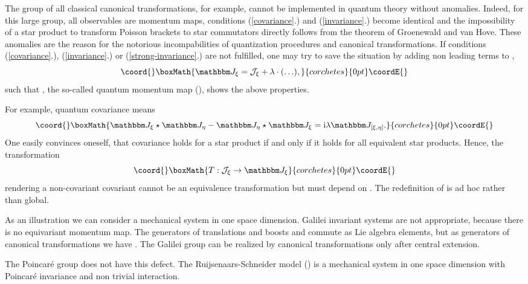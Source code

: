 \documentclass[a4paper,12pt]{article}
\begin{document}
The group of all classical canonical transformations, for example, cannot be
implemented in quantum theory without anomalies. Indeed, for this large group,
all observables are momentum maps, conditions (\ref{covariance}.) and
(\ref{invariance}.) become identical and  
the impossibility of a star product to transform Poisson brackets to star
commutators directly follows from the theorem of Groenewald and van Hove. These
anomalies are the reason for the notorious incompabilities of quantization
procedures and canonical transformations. If conditions (\ref{covariance}.),
(\ref{invariance}.) or (\ref{strong-invariance}.) are not fulfilled, one may try
to save the situation by adding non leading terms to \coordHE{},
\[\coord{}\boxMath{
\mathbbm J_\xi=\mathcal J_\xi+\lambda\cdot(\ldots),
}{corchetes}{0pt}\coordE{}\]
such that \coordHE{}, the so-called quantum momentum map (\cite{Xu98}),
shows the above properties. 

For example, quantum covariance means
\[\coord{}\boxMath{
\mathbbm J_\xi\star\mathbbm J_\eta-\mathbbm J_\eta\star\mathbbm J_\xi
=\textrm{i}\lambda\mathbbm J_{[\xi,\eta]}.
}{corchetes}{0pt}\coordE{}\]
One easily convinces oneself, that covariance holds for a star product \myHighlight{$\star$}\coordHE{}
if and only if it holds for all equivalent star products. Hence, the
transformation 
\[\coord{}\boxMath{
T:\mathcal J_\xi\rightarrow\mathbbm J_\xi
}{corchetes}{0pt}\coordE{}\]
rendering a non-covariant \coordHE{} covariant cannot be an equivalence
transformation but must depend on \myHighlight{$\xi$}\coordHE{}. The redefinition of \coordHE{} is 
ad hoc rather than global.

As an illustration we can consider a mechanical system in one space
dimension. Galilei invariant systems are not appropriate, because there is no
equivariant momentum map. The generators of translations and boosts \coordHE{} and \coordHE{}
commute
as Lie algebra elements, but as generators of canonical transformations we have
\coordHE{}. The Galilei group can be realized by canonical transformations only 
after central extension.

The Poincar\'e group does not have this defect. The Ruijsenaars-Schneider model
(\cite{RuijSch86})
is a mechanical system in one space dimension with Poincar\'e invariance and non 
trivial interaction.
\end{document}
